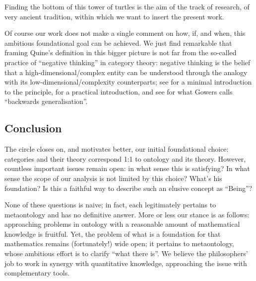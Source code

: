 Finding the bottom of this tower of turtles is the aim of the track of research, of very ancient tradition, within which we want to insert the present work.

Of course our work does not make a single comment on how, if, and when, this ambitious foundational goal can be achieved. We just find remarkable that framing Quine's definition in this bigger picture is not far from the so-called practice of ``negative thinking'' in category theory: negative thinking is the belief that a high-dimensional/complex entity can be understood through the analogy with its low-dimensional/complexity counterparts; see \cite{nlab:category-order,nlab:neg-think} for a minimal introduction to the principle, \cite{baez2010lectures} for a practical introduction, and see \cite{gowers2007} for what Gowers calls ``backwards generalisation''.
\subsection{Conclusion}
The circle closes on, and motivates better, our initial foundational choice: categories and their theory correspond 1:1 to ontology and its theory. However, countless important issues remain open: in what sense this is satisfying? In what sense the scope of our analysis is not limited by this choice? What's his foundation? Is this a faithful way to describe such an elusive concept as ``Being''?

None of these questions is naive; in fact, each legitimately pertains to metaontology and has no definitive answer. More or less our stance is as follows: approaching problems in ontology with a reasonable amount of mathematical knowledge is fruitful. Yet, the problem of what is a foundation for that mathematics remains (fortunately!) wide open; it pertains to metaontology, whose ambitious effort is to clarify ``what there is''. We believe the philosophers' job to work in synergy with quantitative knowledge, approaching the issue with complementary tools.